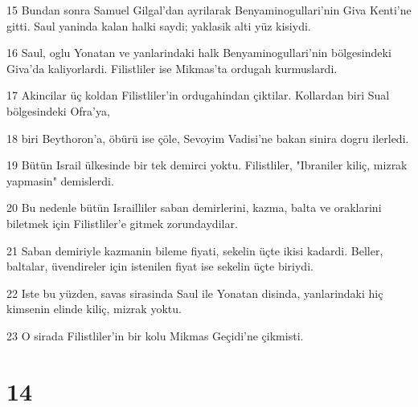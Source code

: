 \par 15 Bundan sonra Samuel Gilgal'dan ayrilarak Benyaminogullari'nin Giva Kenti'ne gitti. Saul yaninda kalan halki saydi; yaklasik alti yüz kisiydi.
\par 16 Saul, oglu Yonatan ve yanlarindaki halk Benyaminogullari'nin bölgesindeki Giva'da kaliyorlardi. Filistliler ise Mikmas'ta ordugah kurmuslardi.
\par 17 Akincilar üç koldan Filistliler'in ordugahindan çiktilar. Kollardan biri Sual bölgesindeki Ofra'ya,
\par 18 biri Beythoron'a, öbürü ise çöle, Sevoyim Vadisi'ne bakan sinira dogru ilerledi.
\par 19 Bütün Israil ülkesinde bir tek demirci yoktu. Filistliler, "Ibraniler kiliç, mizrak yapmasin" demislerdi.
\par 20 Bu nedenle bütün Israilliler saban demirlerini, kazma, balta ve oraklarini biletmek için Filistliler'e gitmek zorundaydilar.
\par 21 Saban demiriyle kazmanin bileme fiyati, sekelin üçte ikisi kadardi. Beller, baltalar, üvendireler için istenilen fiyat ise sekelin üçte biriydi.
\par 22 Iste bu yüzden, savas sirasinda Saul ile Yonatan disinda, yanlarindaki hiç kimsenin elinde kiliç, mizrak yoktu.
\par 23 O sirada Filistliler'in bir kolu Mikmas Geçidi'ne çikmisti.

\chapter{14}

